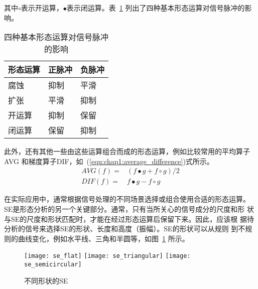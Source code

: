 其中$\circ$表示开运算，$\bullet$表示闭运算。表~\ref{tab:morphological_operator_effect}
列出了四种基本形态运算对信号脉冲的影响。
\begin{table}[htb]
  \centering
  \begin{minipage}[t]{0.6\linewidth}
  \caption{四种基本形态运算对信号脉冲的影响}
  \label{tab:morphological_operator_effect}
    \begin{tabularx}{\linewidth}{XXX}
      \toprule[1.5pt]
      形态运算 & 正脉冲 & 负脉冲 \\\midrule[1pt]
      腐蚀 & 抑制 & 平滑 \\
      扩张 & 平滑 & 抑制 \\
      开运算 & 抑制 & 保留 \\
      闭运算 & 保留 & 抑制 \\
      \bottomrule[1.5pt]
    \end{tabularx}
  \end{minipage}
\end{table}

此外，还有其他一些由这些运算组合而成的形态运算，例如比较常用的平均算子AVG
和梯度算子DIF，如~(\ref{equ:chap1:average_difference})式所示。
\begin{equation}
  \label{equ:chap1:average_difference}
  \begin{aligned}
    AVG(f) = & (f\bullet g + f\circ g)/2 \\
    DIF(f) = & f\bullet g - f\circ g 
  \end{aligned}
\end{equation}

在实际应用中，通常根据信号处理的不同场景选择或组合使用合适的形态运算。
SE是形态分析的另一个关键部分。通常，只有当所关心的信号成分的尺度和形
状与SE的尺度和形状匹配时，才能在经过形态运算后保留下来。因此，应该根
据待分析的信号来选择SE的形状、长度和高度（振幅）。SE的形状可以从规则
到不规则的曲线变化，例如水平线、三角和半圆等，如图~\ref{fig:se_shape}
所示。
\begin{figure}[ht]
  \centering
  {\texttt{[image: se\_flat]}}
  \hspace{4em}
  {\texttt{[image: se\_triangular]}}
  \hspace{4em}
  {\texttt{[image: se\_semicircular]}}
  \caption{不同形状的SE}
  \label{fig:se_shape}
\end{figure}

